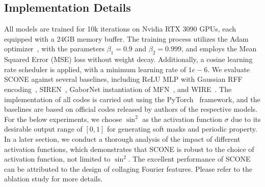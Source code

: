 \documentclass[letterpaper]{article} %
\newcommand{\note}{\textcolor{red}}
\begin{document}
\label{sec:experiments}
\subsection{Implementation Details}
All models are trained for 10k iterations on Nvidia RTX 3090 GPUs, each equipped with a 24GB memory buffer. The training process utilizes the Adam optimizer~\cite{kingma2014adam}, with the parameters $\beta_1 = 0.9$ and $\beta_2 = 0.999$, and employs the Mean Squared Error (MSE) loss without weight decay. Additionally, a cosine learning rate scheduler is applied, with a minimum learning rate of $1e-6$. We evaluate SCONE against several baselines, including ReLU MLP with Gaussian RFF encoding~\cite{tancik2020fourier}, SIREN~\cite{2020siren}, GaborNet instantiation of MFN~\cite{fathony2020multiplicative}, and WIRE~\cite{saragadam2023wire}. The implementation of all codes is carried out using the PyTorch~\cite{pytorch} framework, and the baselines are based on official codes released by authors of the respective models. For the below experiments, we choose $\sin^2$ as the activation function $\sigma$ due to its desirable output range of $[0,1]$ for generating soft masks and periodic property. In a later section, we conduct a thorough analysis of the impact of different activation functions, which demonstrates that SCONE is robust to the choice of activation function, not limited to $\sin^2$. The excellent performance of SCONE can be attributed to the design of collaging Fourier features. Please refer to the ablation study for more details.

\end{document}
